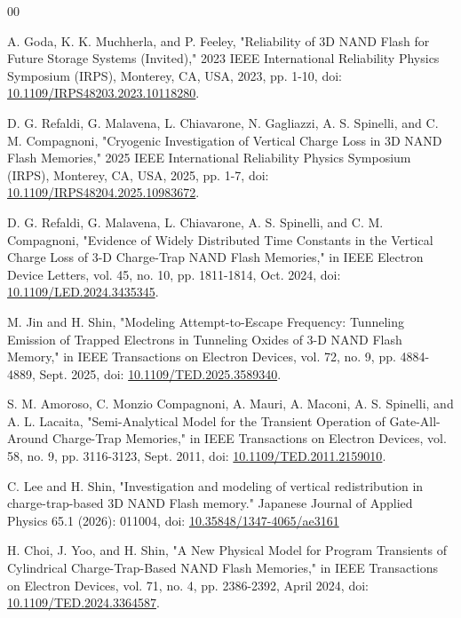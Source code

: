 \documentclass[journal,twoside,web]{ieeecolor}
\begin{document}
\newpage
\begin{thebibliography}{00}

 A. Goda, K. K. Muchherla, and P. Feeley, "Reliability of 3D NAND Flash for Future Storage Systems (Invited)," 2023 IEEE International Reliability Physics Symposium (IRPS), Monterey, CA, USA, 2023, pp. 1-10, doi: \href{https://doi.org/10.1109/IRPS48203.2023.10118280}{10.1109/IRPS48203.2023.10118280}.

 D. G. Refaldi, G. Malavena, L. Chiavarone, N. Gagliazzi, A. S. Spinelli, and C. M. Compagnoni, "Cryogenic Investigation of Vertical Charge Loss in 3D NAND Flash Memories," 2025 IEEE International Reliability Physics Symposium (IRPS), Monterey, CA, USA, 2025, pp. 1-7, doi: \href{https://doi.org/10.1109/IRPS48204.2025.10983672}{10.1109/IRPS48204.2025.10983672}.

 D. G. Refaldi, G. Malavena, L. Chiavarone, A. S. Spinelli, and C. M. Compagnoni, "Evidence of Widely Distributed Time Constants in the Vertical Charge Loss of 3-D Charge-Trap NAND Flash Memories," in IEEE Electron Device Letters, vol. 45, no. 10, pp. 1811-1814, Oct. 2024, doi: \href{https://doi.org/10.1109/LED.2024.3435345}{10.1109/LED.2024.3435345}.

 M. Jin and H. Shin, "Modeling Attempt-to-Escape Frequency: Tunneling Emission of Trapped Electrons in Tunneling Oxides of 3-D NAND Flash Memory," in IEEE Transactions on Electron Devices, vol. 72, no. 9, pp. 4884-4889, Sept. 2025, doi: \href{https://doi.org/10.1109/TED.2025.3589340}{10.1109/TED.2025.3589340}.

 S. M. Amoroso, C. Monzio Compagnoni, A. Mauri, A. Maconi, A. S. Spinelli, and A. L. Lacaita, "Semi-Analytical Model for the Transient Operation of Gate-All-Around Charge-Trap Memories," in IEEE Transactions on Electron Devices, vol. 58, no. 9, pp. 3116-3123, Sept. 2011, doi: \href{https://doi.org/10.1109/TED.2011.2159010}{10.1109/TED.2011.2159010}.

 C. Lee and H. Shin, "Investigation and modeling of vertical redistribution in charge-trap-based 3D NAND Flash memory." Japanese Journal of Applied Physics 65.1 (2026): 011004, doi: \href{https://doi.org/10.35848/1347-4065/ae3161}{10.35848/1347-4065/ae3161}

 H. Choi, J. Yoo, and H. Shin, "A New Physical Model for Program Transients of Cylindrical Charge-Trap-Based NAND Flash Memories," in IEEE Transactions on Electron Devices, vol. 71, no. 4, pp. 2386-2392, April 2024, doi: \href{https://doi.org/10.1109/TED.2024.3364587}{10.1109/TED.2024.3364587}.


\end{thebibliography}
\end{document}

